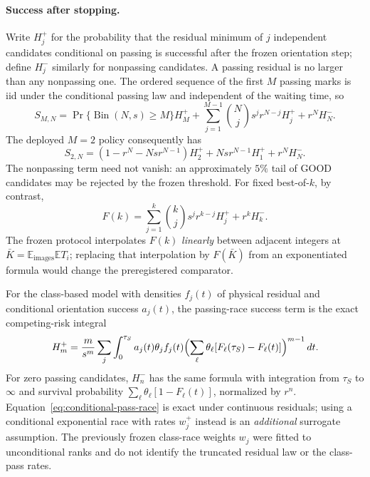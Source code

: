 \paragraph{Success after stopping.}
Write $H_j^+$ for the probability that the residual minimum of $j$
independent candidates conditional on passing is successful after the
frozen orientation step; define $H_j^-$ similarly for nonpassing
candidates. A passing residual is no larger than any nonpassing one.
The ordered sequence of the first $M$ passing marks is iid under the
conditional passing law and independent of the waiting time, so
\begin{equation}\label{eq:stop-success-general}
 S_{M,N}=\Pr\{\operatorname{Bin}(N,s)\ge M\}H_M^+
 +\sum_{j=1}^{M-1}\binom Nj s^j r^{N-j}H_j^+ +r^N H_N^-.
\end{equation}
The deployed $M=2$ policy consequently has
\begin{equation}\label{eq:stop-success-M2}
 S_{2,N}=(1-r^N-Nsr^{N-1})H_2^+
             +Nsr^{N-1}H_1^++r^NH_N^-.
\end{equation}
The nonpassing term need not vanish: an approximately $5\%$ tail of
GOOD candidates may be rejected by the frozen threshold. For fixed
best-of-$k$, by contrast,
\begin{equation}\label{eq:fixed-success-M2}
 F(k)=\sum_{j=1}^k\binom kj s^j r^{k-j}H_j^++r^kH_k^-.
\end{equation}
The frozen protocol interpolates $F(k)$ \emph{linearly} between adjacent
integers at $\bar K=\mathbb E_{\mathrm{images}}\mathbb E T_i$;
replacing that interpolation by $F(\bar K)$ from an exponentiated
formula would change the preregistered comparator.

For the class-based model with densities $f_j(t)$ of physical residual
and conditional orientation success $a_j(t)$, the passing-race success
term is the exact competing-risk integral
\begin{equation}\label{eq:conditional-pass-race}
 H_m^+=\frac{m}{s^m}\sum_j\int_0^{\tau_S}
 a_j(t)\theta_j f_j(t)
 \Bigl(\sum_{\ell}\theta_\ell
 [F_\ell(\tau_S)-F_\ell(t)]\Bigr)^{m-1}\,dt.
\end{equation}
For zero passing candidates, $H_n^-$ has the same formula with
integration from $\tau_S$ to $\infty$ and survival probability
$\sum_\ell\theta_\ell[1-F_\ell(t)]$, normalized by $r^n$.
Equation~\eqref{eq:conditional-pass-race} is exact under continuous
residuals; using a conditional exponential race with rates $w_j^+$
instead is an \emph{additional} surrogate assumption. The previously
frozen class-race weights $w_j$ were fitted to unconditional ranks
and do not identify the truncated residual law or the class-pass rates.

